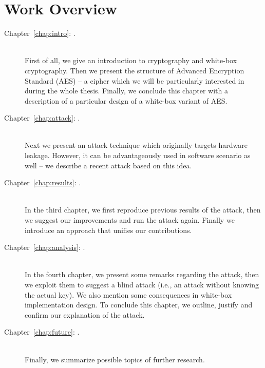 \section*{Work Overview}
	\begin{description}
		\item[Chapter~\ref{chap:intro}: .] ~ \\
			First of all, we give an introduction to cryptography and white-box cryptography. Then we present the structure of Advanced Encryption Standard (AES) -- a cipher which we will be particularly interested in during the whole thesis. Finally, we conclude this chapter with a description of a particular design of a white-box variant of AES.
		\item[Chapter~\ref{chap:attack}: .] ~ \\
			Next we present an attack technique which originally targets hardware leakage. However, it can be advantageously used in software scenario as well -- we describe a recent attack based on this idea.
		\item[Chapter~\ref{chap:results}: .] ~ \\
			In the third chapter, we first reproduce previous results of the attack, then we suggest our improvements and run the attack again. Finally we introduce an approach that unifies our contributions.
		\item[Chapter~\ref{chap:analysis}: .] ~ \\
			In the fourth chapter, we present some remarks regarding the attack, then we exploit them to suggest a blind attack (i.e., an attack without knowing the actual key). We also mention some consequences in white-box implementation design. To conclude this chapter, we outline, justify and confirm our explanation of the attack.
		\item[Chapter~\ref{chap:future}: .] ~ \\
			Finally, we summarize possible topics of further research.
	\end{description}
